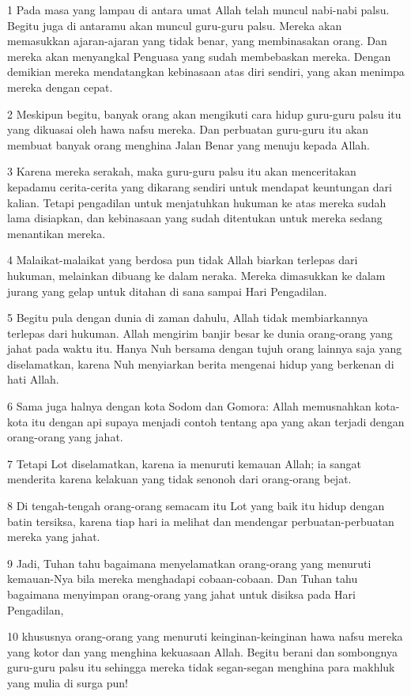 \par 1 Pada masa yang lampau di antara umat Allah telah muncul nabi-nabi palsu. Begitu juga di antaramu akan muncul guru-guru palsu. Mereka akan memasukkan ajaran-ajaran yang tidak benar, yang membinasakan orang. Dan mereka akan menyangkal Penguasa yang sudah membebaskan mereka. Dengan demikian mereka mendatangkan kebinasaan atas diri sendiri, yang akan menimpa mereka dengan cepat.
\par 2 Meskipun begitu, banyak orang akan mengikuti cara hidup guru-guru palsu itu yang dikuasai oleh hawa nafsu mereka. Dan perbuatan guru-guru itu akan membuat banyak orang menghina Jalan Benar yang menuju kepada Allah.
\par 3 Karena mereka serakah, maka guru-guru palsu itu akan menceritakan kepadamu cerita-cerita yang dikarang sendiri untuk mendapat keuntungan dari kalian. Tetapi pengadilan untuk menjatuhkan hukuman ke atas mereka sudah lama disiapkan, dan kebinasaan yang sudah ditentukan untuk mereka sedang menantikan mereka.
\par 4 Malaikat-malaikat yang berdosa pun tidak Allah biarkan terlepas dari hukuman, melainkan dibuang ke dalam neraka. Mereka dimasukkan ke dalam jurang yang gelap untuk ditahan di sana sampai Hari Pengadilan.
\par 5 Begitu pula dengan dunia di zaman dahulu, Allah tidak membiarkannya terlepas dari hukuman. Allah mengirim banjir besar ke dunia orang-orang yang jahat pada waktu itu. Hanya Nuh bersama dengan tujuh orang lainnya saja yang diselamatkan, karena Nuh menyiarkan berita mengenai hidup yang berkenan di hati Allah.
\par 6 Sama juga halnya dengan kota Sodom dan Gomora: Allah memusnahkan kota-kota itu dengan api supaya menjadi contoh tentang apa yang akan terjadi dengan orang-orang yang jahat.
\par 7 Tetapi Lot diselamatkan, karena ia menuruti kemauan Allah; ia sangat menderita karena kelakuan yang tidak senonoh dari orang-orang bejat.
\par 8 Di tengah-tengah orang-orang semacam itu Lot yang baik itu hidup dengan batin tersiksa, karena tiap hari ia melihat dan mendengar perbuatan-perbuatan mereka yang jahat.
\par 9 Jadi, Tuhan tahu bagaimana menyelamatkan orang-orang yang menuruti kemauan-Nya bila mereka menghadapi cobaan-cobaan. Dan Tuhan tahu bagaimana menyimpan orang-orang yang jahat untuk disiksa pada Hari Pengadilan,
\par 10 khususnya orang-orang yang menuruti keinginan-keinginan hawa nafsu mereka yang kotor dan yang menghina kekuasaan Allah. Begitu berani dan sombongnya guru-guru palsu itu sehingga mereka tidak segan-segan menghina para makhluk yang mulia di surga pun!
